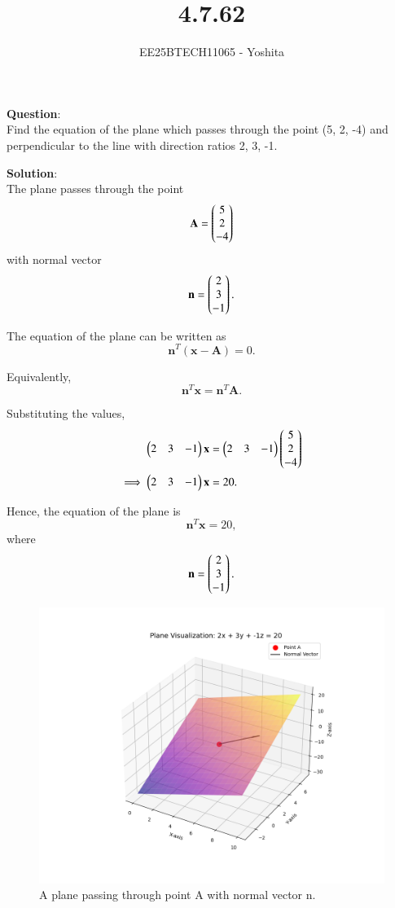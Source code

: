 \documentclass[journal]{IEEEtran}
\begin{document}

\vspace{3cm}

\title{4.7.62}
\author{EE25BTECH11065 - Yoshita}
{\let\newpage\relax\maketitle}

\renewcommand{\thefigure}{\theenumi}
\renewcommand{\thetable}{\theenumi}
\setlength{\intextsep}{10pt} %

\textbf{Question}:\\
Find the equation of the plane which passes through the point (5, 2, -4) and perpendicular to the line with direction ratios 2, 3, -1.\\
\bigskip

\textbf{Solution}:\\
The plane passes through the point
\[
\mathbf{A} = \begin{pmatrix}5\\2\\-4\end{pmatrix}
\]
with normal vector
\[
\mathbf{n} = \begin{pmatrix}2\\3\\-1\end{pmatrix}.
\]

The equation of the plane can be written as
\[
\mathbf{n}^T(\mathbf{x}-\mathbf{A})=0.
\]

Equivalently,
\[
\mathbf{n}^T\mathbf{x}=\mathbf{n}^T\mathbf{A}.
\]

Substituting the values,
\begin{align}
\begin{pmatrix}2 & 3 & -1\end{pmatrix}\mathbf{x} &= \begin{pmatrix}2 & 3 & -1\end{pmatrix}\begin{pmatrix}5\\2\\-4\end{pmatrix} \\
\implies \begin{pmatrix}2 & 3 & -1\end{pmatrix}\mathbf{x} &= 20.
\end{align}

Hence, the equation of the plane is
\[
\mathbf{n}^T\mathbf{x} = 20,
\]
where
\[
\mathbf{n} = \begin{pmatrix}2\\3\\-1\end{pmatrix}.
\]

\begin{figure}[h!]
\begin{center}
\includegraphics[width=\columnwidth]{figs/fig4.png}
\end{center}
\caption{A plane passing through point A with normal vector n.}
\label{fig:Fig.1}
\end{figure}
\end{document}
